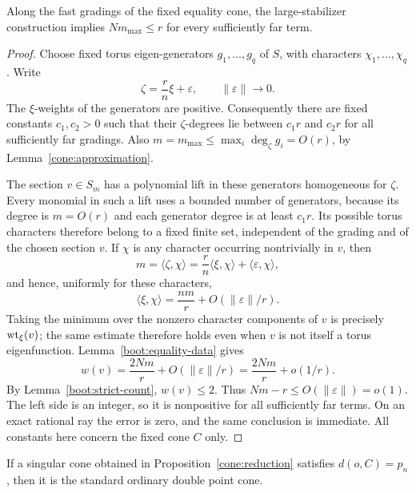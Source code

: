 \begin{lemma}
\label{boot:rounding}
Along the fast gradings of the fixed equality cone, the
large-stabilizer construction implies
$Nm_{\max}\leq r$ for every sufficiently far term.
\end{lemma}

\begin{proof}
Choose fixed torus eigen-generators $g_1,\ldots,g_q$ of
$S$, with characters $\chi_1,\ldots,\chi_q$.  Write
\[
 \zeta=\frac rn\xi+\varepsilon,
 \qquad \|\varepsilon\|\longrightarrow0.
\]
The $\xi$-weights of the generators are positive.
Consequently there are fixed constants $c_1,c_2>0$ such
that their $\zeta$-degrees lie between $c_1r$ and $c_2r$
for all sufficiently far gradings.  Also
$m=m_{\max}\leq\max_i\deg_\zeta g_i=O(r)$, by
Lemma~\ref{cone:approximation}.

The section $v\in S_m$ has a polynomial lift in these
generators homogeneous for $\zeta$.  Every monomial in
such a lift uses a bounded number of generators, because
its degree is $m=O(r)$ and each generator degree is at
least $c_1r$.  Its possible torus characters therefore
belong to a fixed finite set, independent of the grading
and of the chosen section $v$.  If $\chi$ is any character
occurring nontrivially in $v$, then
\[
 m=\langle\zeta,\chi\rangle
   =\frac rn\langle\xi,\chi\rangle
       +\langle\varepsilon,\chi\rangle,
\]
and hence, uniformly for these characters,
\[
 \langle\xi,\chi\rangle
 =\frac{nm}{r}+O(\|\varepsilon\|/r).
\]
Taking the minimum over the nonzero character components
of $v$ is precisely $\operatorname{wt}_\xi(v)$; the same estimate
therefore holds even when $v$ is not itself a torus
eigenfunction.  Lemma~\ref{boot:equality-data} gives
\begin{equation}
 \label{boot:changing-section-error}
 w(v)=\frac{2Nm}{r}
          +O(\|\varepsilon\|/r)
       =\frac{2Nm}{r}+o(1/r).
\end{equation}
By Lemma~\ref{boot:strict-count}, $w(v)\leq2$.
Thus $Nm-r\leq O(\|\varepsilon\|)=o(1)$.
The left side is an integer, so it is nonpositive for
all sufficiently far terms.  On an exact rational ray
the error is zero, and the same conclusion is immediate.
All constants here concern the fixed cone $C$ only.
\end{proof}

\begin{theorem}
\label{boot:equality-cone}
If a singular cone obtained in
Proposition~\ref{cone:reduction} satisfies $d(o,C)=p_n$,
then it is the standard ordinary double point cone.
\end{theorem}

